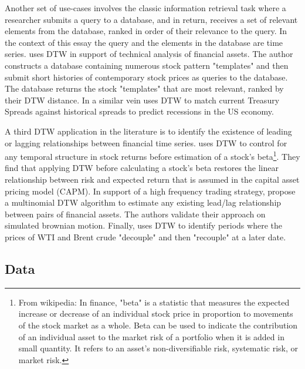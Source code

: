 Another set of use-cases involves the classic information retrieval task where a researcher submits a query to a database, and in return, receives a set of relevant elements from the database, ranked in order of their relevance to the query. In the context of this essay the query and the elements in the database are time series. \cite{WAN2017151} uses DTW in support of technical analysis of financial assets. The author constructs a database containing numerous stock pattern "templates" and then submit short histories of contemporary stock prices as queries to the database. The database returns the stock "templates" that are most relevant, ranked by their DTW distance. In a similar vein \cite{Raihan2017} uses DTW to match current Treasury Spreads against historical spreads to predict recessions in the US economy.

A third DTW application in the literature is to identify the existence of leading or lagging relationships between financial time series. \cite{HowardTalisAlexeev_2020} uses DTW to control for any temporal structure in stock returns before estimation of a stock's beta\footnote{From wikipedia: In finance, "beta" is a statistic that measures the expected increase or decrease of an individual stock price in proportion to movements of the stock market as a whole. Beta can be used to indicate the contribution of an individual asset to the market risk of a portfolio when it is added in small quantity. It refers to an asset's non-diversifiable risk, systematic risk, or market risk.}. They find that applying DTW before calculating a stock's beta restores the linear relationship between risk and expected return that is assumed in the capital asset pricing model (CAPM). In support of a high frequency trading strategy, \cite{Ito_Sakemoto_2020} propose a multinomial DTW algorithm to estimate any existing lead/lag relationship between pairs of financial assets. The authors validate their approach on simulated brownian motion. Finally, \cite{Mastroeni_et_al_2021} uses DTW to identify periods where the prices of WTI and Brent crude "decouple" and then "recouple" at a later date.

\subsection{Data}

